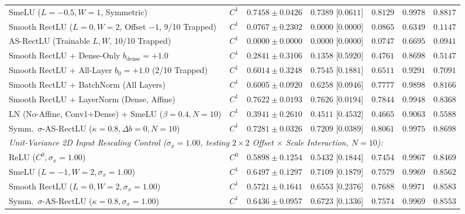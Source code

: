 \documentclass[11pt, a4paper]{article}
\begin{document}
\begin{table}[!htbp]
{\begin{tabular}{l l c c c c c}
\rowcolor{goodgreen}
SmeLU ($L=-0.5, W=1$, Symmetric) \cite{ref41} & $C^{1}$ & $0.7458 \pm 0.0426$ & $0.7389$ [$0.0611$] & $0.8129$ & $0.9978$ & $0.8817$ \\
\rowcolor{alertred}
Smooth RectLU ($L=0, W=2$, Offset $-1$, 9/10 Trapped) & $C^{1}$ & $0.0767 \pm 0.2302$ & $0.0000$ [$0.0000$] & $0.0865$ & $0.6349$ & $0.1147$ \\
\rowcolor{alertred}
AS-RectLU (Trainable $L, W$, 10/10 Trapped) & $C^{1}$ & $0.0000 \pm 0.0000$ & $0.0000$ [$0.0000$] & $0.0747$ & $0.6695$ & $0.0941$ \\
Smooth RectLU + Dense-Only $b_{\text{dense}}=+1.0$ & $C^{1}$ & $0.2841 \pm 0.3106$ & $0.1358$ [$0.5920$] & $0.4761$ & $0.8698$ & $0.5147$ \\
Smooth RectLU + All-Layer $b_{0}=+1.0$ (2/10 Trapped) & $C^{1}$ & $0.6014 \pm 0.3248$ & $0.7545$ [$0.1881$] & $0.6511$ & $0.9291$ & $0.7091$ \\
Smooth RectLU + BatchNorm (All Layers) & $C^{1}$ & $0.6005 \pm 0.0920$ & $0.6258$ [$0.0946$] & $0.7777$ & $0.9898$ & $0.8166$ \\
\rowcolor{goodgreen}
Smooth RectLU + LayerNorm (Dense, Affine) & $C^{1}$ & \textbf{$0.7622 \pm 0.0193$} & $0.7626$ [$0.0194$] & $0.7844$ & $0.9948$ & $0.8368$ \\
LN (No-Affine, Conv1+Dense) + SmeLU ($\beta=0.4, N=10$) & $C^{1}$ & $0.3941 \pm 0.2610$ & $0.4511$ [$0.4532$] & $0.4665$ & $0.9063$ & $0.5588$ \\
\rowcolor{goodgreen}
Symm.\ $\sigma$-AS-RectLU ($\kappa=0.8, \Delta b=0, N=10$) & $C^{1}$ & $0.7281 \pm 0.0326$ & $0.7209$ [$0.0389$] & $0.8061$ & $0.9975$ & $0.8698$ \\
\midrule
\multicolumn{7}{l}{\textit{Unit-Variance 2D Input Rescaling Control ($\sigma_{x} = 1.00$, testing $2 \times 2$ Offset $\times$ Scale Interaction, $N=10$):}} \\
ReLU ($C^{0}, \sigma_{x}=1.00$) & $C^{0}$ & $0.5898 \pm 0.1254$ & $0.5432$ [$0.1844$] & $0.7454$ & $0.9967$ & $0.8469$ \\
SmeLU ($L=-1, W=2, \sigma_{x}=1.00$) & $C^{1}$ & \textbf{$0.6497 \pm 0.1297$} & \textbf{$0.7109$} [$0.1879$] & $0.7579$ & $0.9969$ & $0.8562$ \\
\rowcolor{goodgreen}
Smooth RectLU ($L=0, W=2, \sigma_{x}=1.00$) & $C^{1}$ & $0.5721 \pm 0.1641$ & $0.6553$ [$0.2376$] & \textbf{$0.7688$} & \textbf{$0.9971$} & \textbf{$0.8583$} \\
\rowcolor{goodgreen}
Symm.\ $\sigma$-AS-RectLU ($\kappa=0.8, \sigma_{x}=1.00$) & $C^{1}$ & $0.6436 \pm 0.0957$ & $0.6723$ [$0.1336$] & $0.7574$ & $0.9969$ & $0.8553$ \\

\end{tabular}}
\end{table}
\end{document}

